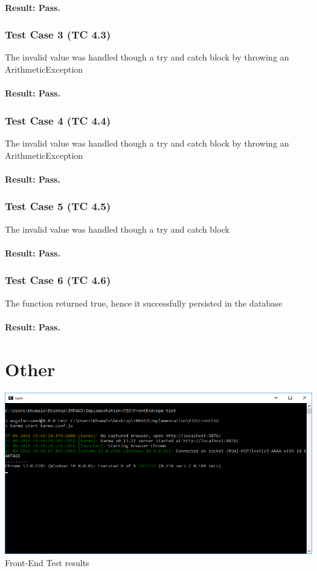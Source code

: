 \documentclass[a4paper,12pt]{article}
\begin{document}
\paragraph{Result: Pass.}

\subsubsection{Test Case 3 (TC 4.3)}
The invalid value was handled though a try and catch block by throwing an ArithmeticException 

\paragraph{Result: Pass.}
\subsubsection{Test Case 4 (TC 4.4)}
The invalid value was handled though a try and catch block by throwing an ArithmeticException 

\paragraph{Result: Pass.}

\subsubsection{Test Case 5 (TC 4.5)}
The invalid value was handled though a try and catch block 
\paragraph{Result: Pass.}

\subsubsection{Test Case 6 (TC 4.6)}
The function returned true, hence it successfully persisted in the database
\paragraph{Result: Pass.}
\section{Other}
\includegraphics[width=1\textwidth]{./Images/AddPropertyKarmaTest.png}\\
Front-End Test results \\
\end{document}
